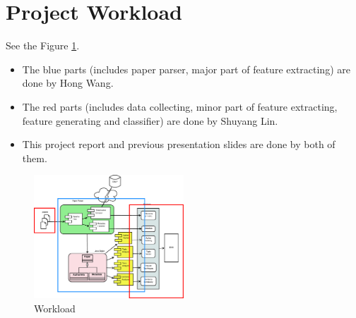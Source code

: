 \documentclass[11pt,letterpaper]{article}
\begin{document}
\section{Project Workload}
See the Figure \ref{fig:workload}.
\begin{itemize}
\item The blue parts (includes paper parser, major part of feature extracting) are done by Hong Wang.
\item	The red parts (includes data collecting, minor part of feature extracting, feature generating and classifier) are done by Shuyang Lin.
\item	This project report and previous presentation slides are done by both of them. 
\end{itemize}


\begin{figure}[htb]
  \centering
	 	 \includegraphics[width=0.5\textwidth]{materials/workload.eps}
		\caption{Workload}
		\label{fig:workload}
\end{figure}
\end{document}
